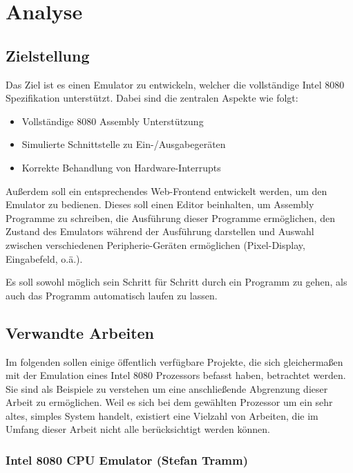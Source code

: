 \chapter{Analyse}

\section{Zielstellung}\label{goals}

Das Ziel ist es einen Emulator zu entwickeln, welcher die vollständige Intel 8080 Spezifikation\cite{datasheet} unterstützt. Dabei sind die zentralen Aspekte wie folgt:

\begin{itemize}
    \item Vollständige 8080 Assembly Unterstützung
    \item Simulierte Schnittstelle zu Ein-/Ausgabegeräten
    \item Korrekte Behandlung von Hardware-Interrupts
\end{itemize}

Außerdem soll ein entsprechendes Web-Frontend entwickelt werden, um den Emulator zu bedienen.
Dieses soll einen Editor beinhalten, um Assembly Programme zu schreiben, die Ausführung dieser Programme ermöglichen, den Zustand des Emulators während der Ausführung darstellen und Auswahl zwischen verschiedenen Peripherie-Geräten ermöglichen (Pixel-Display, Eingabefeld, o.ä.). 

Es soll sowohl möglich sein Schritt für Schritt durch ein Programm zu gehen, als auch das Programm automatisch laufen zu lassen.

\section{Verwandte Arbeiten}\label{chap:similar-work}

Im folgenden sollen einige öffentlich verfügbare Projekte, die sich gleichermaßen mit der Emulation eines Intel 8080 Prozessors befasst haben, betrachtet werden. Sie sind als Beispiele zu verstehen um eine anschließende Abgrenzung dieser Arbeit zu ermöglichen. Weil es sich bei dem gewählten Prozessor um ein sehr altes, simples System handelt, existiert eine Vielzahl von Arbeiten, die im Umfang dieser Arbeit nicht alle berücksichtigt werden können.

\subsection{Intel 8080 CPU Emulator (Stefan Tramm)}

